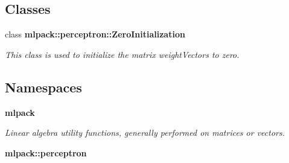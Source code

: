 \subsection*{Classes}
\begin{DoxyCompactItemize}
\item 
class {\bf mlpack\+::perceptron\+::\+Zero\+Initialization}
\begin{DoxyCompactList}\small\item\em This class is used to initialize the matrix weight\+Vectors to zero. \end{DoxyCompactList}\end{DoxyCompactItemize}
\subsection*{Namespaces}
\begin{DoxyCompactItemize}
\item 
 {\bf mlpack}
\begin{DoxyCompactList}\small\item\em Linear algebra utility functions, generally performed on matrices or vectors. \end{DoxyCompactList}\item 
 {\bf mlpack\+::perceptron}
\end{DoxyCompactItemize}
